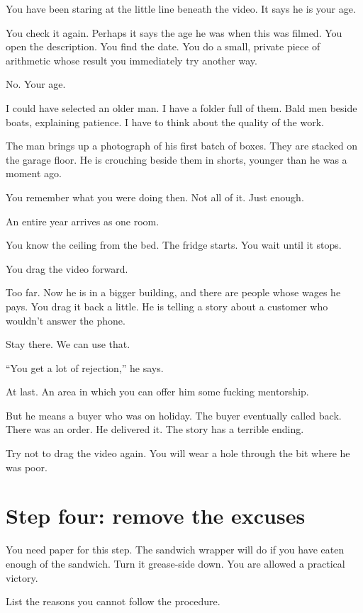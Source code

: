 \documentclass[11pt,oneside]{book}
\begin{document}
You have been staring at the little line beneath the video. It says he is your age.

You check it again. Perhaps it says the age he was when this was filmed. You open the description. You find the date. You do a small, private piece of arithmetic whose result you immediately try another way.

No. Your age.

I could have selected an older man. I have a folder full of them. Bald men beside boats, explaining patience. I have to think about the quality of the work.

The man brings up a photograph of his first batch of boxes. They are stacked on the garage floor. He is crouching beside them in shorts, younger than he was a moment ago.

You remember what you were doing then. Not all of it. Just enough.

An entire year arrives as one room.

You know the ceiling from the bed. The fridge starts. You wait until it stops.

You drag the video forward.

Too far. Now he is in a bigger building, and there are people whose wages he pays. You drag it back a little. He is telling a story about a customer who wouldn't answer the phone.

Stay there. We can use that.

``You get a lot of rejection,'' he says.

At last. An area in which you can offer him some fucking mentorship.

But he means a buyer who was on holiday. The buyer eventually called back. There was an order. He delivered it. The story has a terrible ending.

Try not to drag the video again. You will wear a hole through the bit where he was poor.

\section*{Step four: remove the excuses}

You need paper for this step. The sandwich wrapper will do if you have eaten enough of the sandwich. Turn it grease-side down. You are allowed a practical victory.

List the reasons you cannot follow the procedure.
\end{document}
